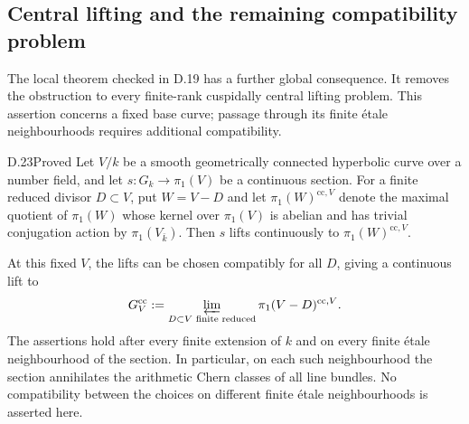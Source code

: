 \subsection{Central lifting and the remaining compatibility problem}

The local theorem checked in D.19 has a further global consequence.  It
removes the obstruction to every finite-rank cuspidally central lifting
problem.  This assertion concerns a fixed base curve; passage through
its finite étale neighbourhoods requires additional compatibility.

\begin{claim}{D.23}{Proved}\label{clm:D23}
Let $V/k$ be a smooth geometrically connected hyperbolic curve over a
number field, and let $s:G_k\to\pi_1(V)$ be a continuous section.  For a
finite reduced divisor $D\subset V$, put $W=V-D$ and let
$\pi_1(W)^{\mathrm{cc},V}$ denote the maximal quotient of $\pi_1(W)$
whose kernel over $\pi_1(V)$ is abelian and has trivial conjugation
action by $\pi_1(V_{\bar k})$.  Then $s$ lifts continuously to
$\pi_1(W)^{\mathrm{cc},V}$.

At this fixed $V$, the lifts can be chosen compatibly for all $D$,
giving a continuous lift to
\[
 G_V^{\mathrm{cc}}:=
 \varprojlim_{D\subset V\text{ finite reduced}}
          \pi_1(V-D)^{\mathrm{cc},V}.
\]
The assertions hold after every finite extension of $k$ and on every
finite étale neighbourhood of the section.  In particular, on each
such neighbourhood the section annihilates the arithmetic Chern
classes of all line bundles.  No compatibility between the choices
on different finite étale neighbourhoods is asserted here.
\end{claim}
